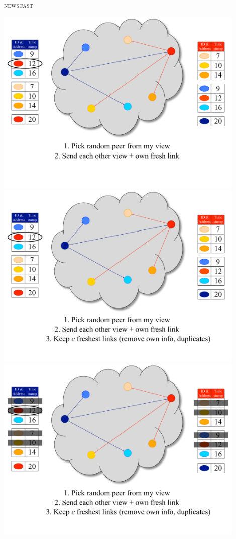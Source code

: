 \begin{frame}{\textsc{newscast}}
\begin{overprint}
\includegraphics[width=0.9\textwidth]{7_newscast}
\includegraphics[width=0.9\textwidth]{8_newscast}
\includegraphics[width=0.9\textwidth]{9_newscast}

\end{overprint}
\end{frame}
